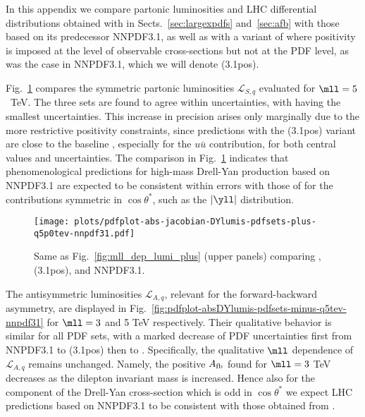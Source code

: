 
In this appendix we compare partonic luminosities
and LHC differential distributions obtained with  in
Sects.~\ref{sec:largexpdfs}
and~\ref{sec:afb} with those based 
on its predecessor
NNPDF3.1, as well as with a variant of 
where positivity is imposed at the level of observable cross-sections but
not at the PDF level, as was the case in  NNPDF3.1, which we will denote
(3.1pos).

Fig.~\ref{fig:pdfplot-absDYlumis-pdfsets-plus-q5tev-nnpdf31}
compares the 
symmetric partonic luminosities $\mathcal{L}_{S,q}$
evaluated for $\mll=5$~TeV.
%
The three sets are found to agree within uncertainties,
with  having the smallest uncertainties.
%
This increase in precision
arises only marginally due to the more restrictive positivity constraints,
since predictions with the (3.1pos) variant 
are close to the baseline , especially 
for the $u\bar{u}$ contribution, for both central values and uncertainties.
%
The comparison in Fig.~\ref{fig:pdfplot-absDYlumis-pdfsets-plus-q5tev-nnpdf31}
indicates that phenomenological predictions for high-mass Drell-Yan
production based on NNPDF3.1 are expected
to be consistent within errors with those of  for the contributions
symmetric in $\cos\theta^*$, such as the $|\yll|$ distribution.

\begin{figure}[!t]
 \centering
 \texttt{[image: plots/pdfplot-abs-jacobian-DYlumis-pdfsets-plus-q5p0tev-nnpdf31.pdf]}
 \caption{Same as Fig.~\ref{fig:mll_dep_lumi_plus} (upper panels) comparing
, (3.1pos), and NNPDF3.1.
 }    
 \label{fig:pdfplot-absDYlumis-pdfsets-plus-q5tev-nnpdf31}
\end{figure}

The antisymmetric luminosities $\mathcal{L}_{A,q}$, relevant for the
forward-backward asymmetry, are displayed in Fig.~\ref{fig:pdfplot-absDYlumis-pdfsets-minus-q5tev-nnpdf31}
for $\mll = 3$ and 5 TeV respectively.
%
Their qualitative behavior is similar for all  PDF sets,
with a marked decrease of PDF uncertainties first from NNPDF3.1
to  (3.1pos)  then
to .
%
Specifically, the qualitative $\mll$ dependence
of $\mathcal{L}_{A,q}$ remains unchanged. Namely, the positive $A_{\rm fb}$
found for $\mll= 3$ TeV decreases 
as the dilepton invariant mass is increased.
%
Hence also for the component of the Drell-Yan cross-section which is odd
in $\cos\theta^*$ we expect LHC predictions based on NNPDF3.1 to be consistent
with those obtained from .

